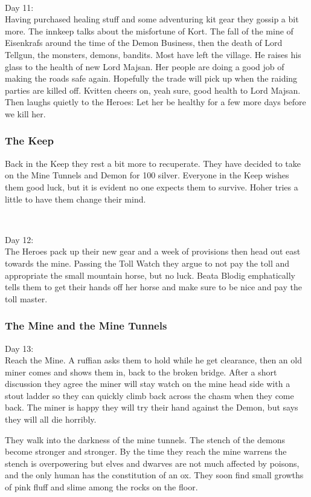 \

Day 11:\\
Having purchased healing stuff and some adventuring kit gear they gossip a bit more.
The innkeep talks about the misfortune of Kort. The fall of the mine of Eisenkrafs around the time of the Demon Business, then the death of Lord Tellgun, the monsters, demons, bandits. Most have left the village. He raises his glass to the health of new Lord Majsan. Her people are doing a good job of making the roads safe again. Hopefully the trade will pick up when the raiding parties are killed off.
Kvitten cheers on, yeah sure, good health to Lord Majsan. Then laughs quietly to the Heroes: Let her be healthy for a few more days before we kill her.


\subsubsection*{The Keep}
Back in the Keep they rest a bit more to recuperate. They have decided to take on the Mine Tunnels and Demon for 100 silver. Everyone in the Keep wishes them good luck, but it is evident no one expects them to survive. Hoher tries a little to have them change their mind.

\

Day 12:\\
The Heroes pack up their new gear and a week of provisions then head out east towards the mine. Passing the Toll Watch they argue to not pay the toll and appropriate the small mountain horse, but no luck. Beata Blodig emphatically tells them to get their hands off her horse and make sure to be nice and pay the toll master.


\subsubsection*{The Mine and the Mine Tunnels}
\forceindent Day 13:\\
Reach the Mine. A ruffian asks them to hold while he get clearance, then an old miner comes and shows them in, back to the broken bridge. After a short discussion they agree the miner will stay watch on the mine head side with a stout ladder so they can quickly climb back across the chasm when they come back. The miner is happy they will try their hand against the Demon, but says they will all die horribly.

They walk into the darkness of the mine tunnels. The stench of the demons become stronger and stronger. By the time they reach the mine warrens the stench is overpowering but elves and dwarves are not much affected by poisons, and the only human has the constitution of an ox. They soon find small growths of pink fluff and slime among the rocks on the floor.

